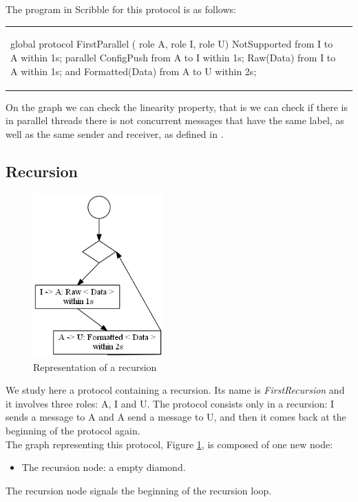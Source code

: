 \documentclass[a4paper,11pt,twoside]{report}
\begin{document}
The program in Scribble for this protocol is as follows:
\begin{center}
\begin{tabular}{ll}
\begin{SJLISTING}
global protocol FirstParallel ( role A, role I, role U) {
	NotSupported from I to A within 1s;
	parallel {
		ConfigPush from A to I within 1s; 
		Raw(Data) from I to A within 1s;
		} and {
		Formatted(Data) from A to U within 2s;
		}
}
\end{SJLISTING}
& \\
\end{tabular}
\end{center}

On the graph we can check the linearity property, that is we can check if there is in parallel threads there is not concurrent messages that have the same label, as well as the same sender and receiver, as defined in \cite{denielou2012multiparty}.

\subsection{Recursion}
\begin{figure}[h]
\begin{center}
\includegraphics[width=5cm]{Recursion}\caption{Representation of a recursion}
\label{fig:Recursion}
\end{center}
\end{figure}
We study here a protocol containing a recursion. Its name is \emph{FirstRecursion} and it involves three roles: A, I and U. The protocol consists only in a recursion: I sends a message to A and A send a message to U, and then it comes back at the beginning of the protocol again.\\
The graph representing this protocol, Figure \ref{fig:Recursion}, is composed of one new node:
\begin{itemize}
\item The recursion node: a empty diamond.
\end{itemize}
The recursion node signals the beginning of the recursion loop. 
\end{document}
